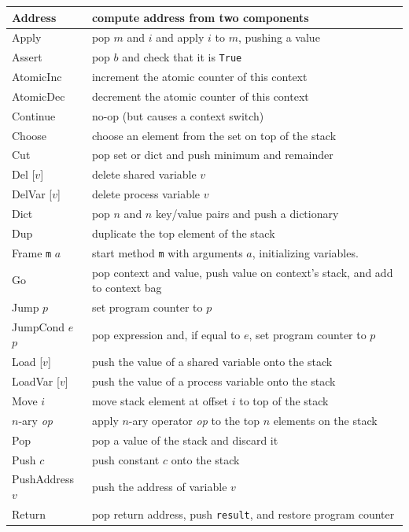 \documentclass{report}
\begin{document}
{\small
\begin{tabular}{|l|l|}
\hline
Address & compute address from two components \\
\hline
Apply & pop $m$ and $i$ and apply $i$ to $m$, pushing a value \\
\hline
Assert & pop $b$ and check that it is \texttt{True} \\
\hline
AtomicInc & increment the atomic counter of this context \\
\hline
AtomicDec & decrement the atomic counter of this context \\
\hline
Continue & no-op (but causes a context switch) \\
\hline
Choose & choose an element from the set on top of the stack \\
\hline
Cut & pop set or dict and push minimum and remainder \\
\hline
Del [$v$] & delete shared variable $v$ \\
\hline
DelVar [$v$] & delete process variable $v$ \\
\hline
Dict & pop $n$ and $n$ key/value pairs and push a dictionary \\
\hline
Dup & duplicate the top element of the stack \\
\hline
Frame \texttt{m} $a$ & start method \texttt{m} with arguments $a$,
initializing variables.  \\
\hline
Go & pop context and value, push value on context's stack, and add to context bag \\
\hline
Jump $p$ & set program counter to $p$ \\
\hline
JumpCond $e$ $p$ & pop expression and, if equal to $e$, set program counter to $p$ \\
\hline
Load [$v$] & push the value of a shared variable onto the stack \\
\hline
LoadVar [$v$] & push the value of a process variable onto the stack \\
\hline
Move $i$ & move stack element at offset $i$ to top of the stack \\
\hline
$n$-ary \textit{op} & apply $n$-ary operator \textit{op} to the top $n$ elements on the stack \\
\hline
Pop & pop a value of the stack and discard it \\
\hline
Push $c$ & push constant $c$ onto the stack \\
\hline
PushAddress $v$ & push the address of variable $v$ \\
\hline
Return & pop return address, push \texttt{result}, and restore program counter \\

\end{tabular}}
\end{document}
